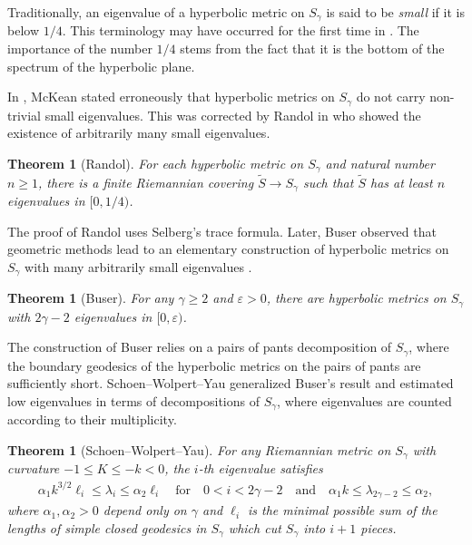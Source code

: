 \documentclass[a4paper,11pt]{amsart}
\numberwithin{equation}{section}
\newtheorem{thm}[equation]{Theorem}
\theoremstyle{definition}
\def\ve{\varepsilon}
\begin{document}
Traditionally, an eigenvalue of a hyperbolic metric on $S_\gamma$ is said to be \emph{small} if it is below $1/4$.
This terminology may have occurred for the first time in \cite[page 386]{Hu}.
The importance of the number $1/4$ stems from the fact that it is the bottom of the spectrum of the hyperbolic plane.

In \cite[1972]{McK}, McKean stated erroneously that hyperbolic metrics on $S_\gamma$ do not carry non-trivial small eigenvalues.
This was corrected by Randol in \cite[1974]{Ra} who showed the existence of arbitrarily many small eigenvalues.

\begin{thm}[Randol]\label{iran}
For each hyperbolic metric on $S_\gamma$ and natural number $n\ge1$,
there is a finite Riemannian covering $\tilde S\to S_\gamma$ such that $\tilde S$ has at least $n$ eigenvalues in $[0,1/4)$.
\end{thm}

The proof of Randol uses Selberg's trace formula. 
Later, Buser observed that geometric methods lead to an elementary construction of hyperbolic metrics on $S_\gamma$ with many arbitrarily small eigenvalues \cite[1977]{Bu1}.

\begin{thm}[Buser]\label{ibus}
For any $\gamma\ge2$ and $\ve>0$, there are hyperbolic metrics on $S_\gamma$ with $2\gamma-2$ eigenvalues in $[0,\ve)$.
\end{thm}

The construction of Buser relies on a pairs of pants decomposition of $S_\gamma$, where the boundary geodesics of the hyperbolic metrics on the pairs of pants are sufficiently short.
Schoen--Wolpert--Yau \cite[1980]{SWY} generalized Buser's result and estimated low eigenvalues in terms of decompositions of $S_\gamma$,
where eigenvalues are counted according to their multiplicity.

\begin{thm}[Schoen--Wolpert--Yau]\label{iswy}
For any Riemannian metric on $S_\gamma$ with curvature $-1\le K\le-k<0$, the $i$-th eigenvalue satisfies
\begin{align*}
  \alpha_1k^{3/2}\ell_i\le\lambda_i\le \alpha_2\ell_i \quad\text{for}\quad 0<i<2\gamma-2 \quad\text{and}\quad \alpha_1k\le\lambda_{2\gamma-2}\le \alpha_2,
\end{align*}
where $\alpha_1,\alpha_2>0$ depend only on $\gamma$ and $\ell_i$ is the minimal possible sum of the lengths of simple closed geodesics in $S_\gamma$ which cut $S_\gamma$ into $i+1$ pieces.
\end{thm}
\end{document}
